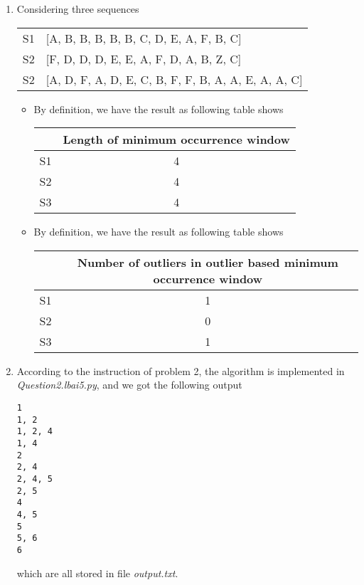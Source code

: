 \documentclass[11pt]{article}
\begin{document}
	\begin{enumerate}
		\item Considering three sequences
		
		\begin{tabular}{c | l}
			S1 & [A, B, B, B, B, B, C, D, E, A, F, B, C]\\
			S2 & [F, D, D, D, E, E, A, F, D, A, B, Z, C]\\
			S2 & [A, D, F, A, D, E, C, B, F, F, B, A, A, E, A, A, C]
		\end{tabular}
		\begin{itemize}
			\item By definition, we have the result as following table shows
			\begin{center}
			\begin{tabular}{|c | c|}
				\hline
					& Length of minimum occurrence window\\
				\hline
				S1 & 4\\
				\hline
				S2 & 4\\
				\hline
				S3 & 4\\
				\hline
			\end{tabular}
			\end{center}
			\item
			By definition, we have the result as following table shows
			\begin{center}
			\begin{tabular}{|c | c|}
				\hline
					& Number of outliers in outlier based minimum occurrence window\\
				\hline
				S1 & 1\\
				\hline
				S2 & 0\\
				\hline
				S3 & 1\\
				\hline
			\end{tabular}
			\end{center}
		\end{itemize}
		\item According to the instruction of problem 2, the algorithm is implemented in \textit{Question2.lbai5.py}, and we got the following output
		\begin{lstlisting}
1
1, 2
1, 2, 4
1, 4
2
2, 4
2, 4, 5
2, 5
4
4, 5
5
5, 6
6
		\end{lstlisting}
		
	which are all stored in file \textit{output.txt}.
	\end{enumerate}
\end{document}
